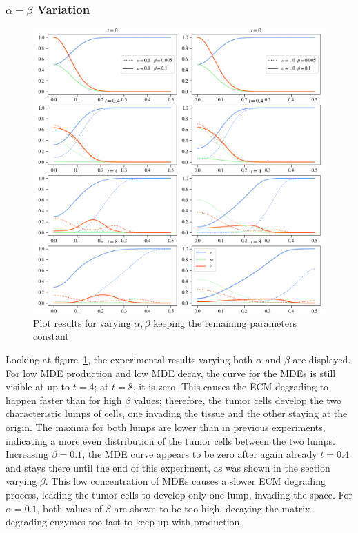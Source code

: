 \subsubsection*{$\alpha - \beta$ Variation}
\begin{figure}[h!]
    \centering
    \includegraphics[width=\textwidth]{resources/images/alpha_beta_variation.png}
    \caption{Plot results for varying $\alpha, \beta$ keeping the remaining parameters constant}
    \label{fig:alpha_beta_variation}
\end{figure}
Looking at figure~\ref{fig:alpha_beta_variation}, the experimental results varying both $\alpha$ and $\beta$ are displayed. For low MDE production and low MDE decay, the curve for the MDEs is still visible at up to $t=4$; at $t=8$, it is zero. This causes the ECM degrading to happen faster than for high $\beta$ values; therefore, the tumor cells develop the two characteristic lumps of cells, one invading the tissue and the other staying at the origin. The maxima for both lumps are lower than in previous experiments, indicating a more even distribution of the tumor cells between the two lumps. Increasing $\beta=0.1$, the MDE curve appears to be zero after again already $t=0.4$ and stays there until the end of this experiment, as was shown in the section varying $\beta$. This low concentration of MDEs causes a slower ECM degrading process, leading the tumor cells to develop only one lump, invading the space. For $\alpha=0.1$, both values of $\beta$ are shown to be too high, decaying the matrix-degrading enzymes too fast to keep up with production.

